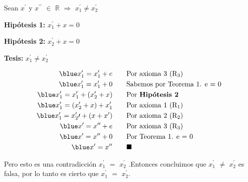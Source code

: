 \documentclass[12pt]{article}
\renewcommand{\qedsymbol}{$\blacksquare$}
\begin{document}
{}\vspace{0.5cm}

{} Sean $x^{\prime}$ y $x^{{\prime}{\prime}}$ $\in$  $\mathbb{R}$ $\Rightarrow$ $x_1^{\prime}\neq x_2^{\prime}$

\begin{center}
    {{\textbf{Hipótesis 1:}}} $x_1^{\prime} + x = 0$
\end{center}

\begin{center}
{{\textbf{Hipótesis 2:}}} $x_2^{\prime} + x = 0$
\end{center}

\begin{center}
    {{\textbf{Tesis:}}} $ x_1^{\prime} \neq x_2^{\prime}$
\end{center}



{}
\begin{align*}
\blue
  x_1^{\prime} =  x_1^{\prime} + e & \qquad \textup{Por axioma 3 (R$_3$)}\\
  \blue
  x_1^{\prime} =  x_1^{\prime} + 0 & \qquad \textup{Sabemos por Teorema 1. e = 0}\\
  \blue
  x_1^{\prime} =  x_1^{\prime} + (x_2^{\prime}+x) & \qquad \textup{Por \textbf{Hipótesis 2}}\\
  \blue
 x_1^{\prime} =  (x_2^{\prime}+x)+x_1^{\prime} & \qquad \textup{Por axioma 1 (R$_1$)}\\
 \blue
  x_1^{\prime} = x_2^{\prime}{\prime}+(x+x^{\prime}) & \qquad \textup{Por axioma 2 (R$_2$)}\\
  \blue
  x^{\prime} =  x^{{\prime}{\prime}} + e & \qquad \textup{Por axioma 3 (R$_3$)}\\
  \blue
  x^{\prime} =  x^{{\prime}{\prime}} + 0 & \qquad \textup{Por Teorema 1. e = 0} \\
  \blue
  x^{\prime} =  x^{{\prime}{\prime}} & \qquad \textup{\qedsymbol}\\
\end{align*}

Pero esto es una contradicción $x_1^{\prime}$ $=$ $x_2^{\prime}$ .Entonces concluimos que $x_1^{\prime}$ $\neq$ $x_2^{\prime}$ es falsa, por lo tanto es cierto que $x_1^{\prime}$ $=$ $x_2^{\prime}$.
\vspace{2cm}

\section*{} 
\end{document}
